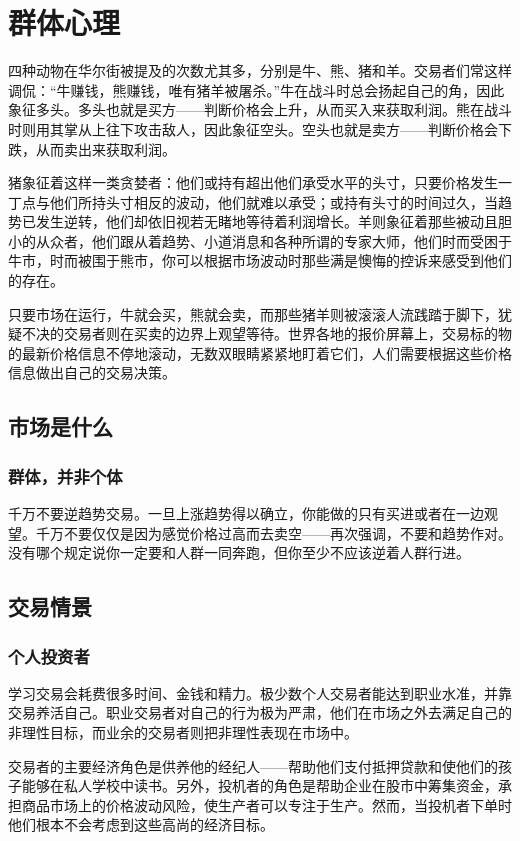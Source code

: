 \chapter{群体心理}
四种动物在华尔街被提及的次数尤其多，分别是牛、熊、猪和羊。交易者们常这样调侃：“牛赚钱，熊赚钱，唯有猪羊被屠杀。”牛在战斗时总会扬起自己的角，因此象征多头。多头也就是买方——判断价格会上升，从而买入来获取利润。熊在战斗时则用其掌从上往下攻击敌人，因此象征空头。空头也就是卖方——判断价格会下跌，从而卖出来获取利润。

猪象征着这样一类贪婪者：他们或持有超出他们承受水平的头寸，只要价格发生一丁点与他们所持头寸相反的波动，他们就难以承受；或持有头寸的时间过久，当趋势已发生逆转，他们却依旧视若无睹地等待着利润增长。羊则象征着那些被动且胆小的从众者，他们跟从着趋势、小道消息和各种所谓的专家大师，他们时而受困于牛市，时而被围于熊市，你可以根据市场波动时那些满是懊悔的控诉来感受到他们的存在。

只要市场在运行，牛就会买，熊就会卖，而那些猪羊则被滚滚人流践踏于脚下，犹疑不决的交易者则在买卖的边界上观望等待。世界各地的报价屏幕上，交易标的物的最新价格信息不停地滚动，无数双眼睛紧紧地盯着它们，人们需要根据这些价格信息做出自己的交易决策。

\section{市场是什么}
\subsection*{群体，并非个体}
千万不要逆趋势交易。一旦上涨趋势得以确立，你能做的只有买进或者在一边观望。千万不要仅仅是因为感觉价格过高而去卖空——再次强调，不要和趋势作对。没有哪个规定说你一定要和人群一同奔跑，但你至少不应该逆着人群行进。

\section{交易情景}
\subsection*{个人投资者}
学习交易会耗费很多时间、金钱和精力。极少数个人交易者能达到职业水准，并靠交易养活自己。职业交易者对自己的行为极为严肃，他们在市场之外去满足自己的非理性目标，而业余的交易者则把非理性表现在市场中。

交易者的主要经济角色是供养他的经纪人——帮助他们支付抵押贷款和使他们的孩子能够在私人学校中读书。另外，投机者的角色是帮助企业在股市中筹集资金，承担商品市场上的价格波动风险，使生产者可以专注于生产。然而，当投机者下单时他们根本不会考虑到这些高尚的经济目标。
